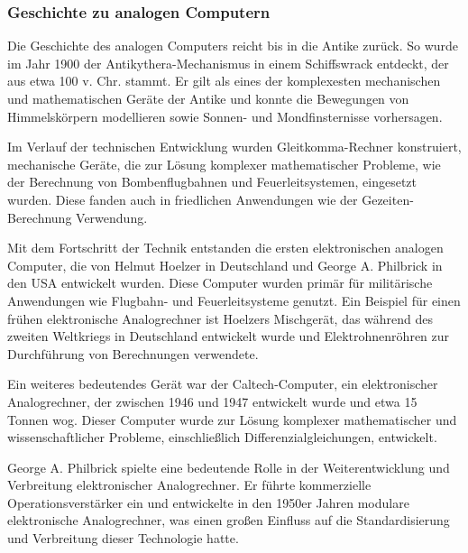 \subsubsection{Geschichte zu analogen Computern}

Die Geschichte des analogen Computers reicht bis in die Antike zurück. So wurde im Jahr 1900 der Antikythera-Mechanismus in einem Schiffswrack entdeckt, der aus etwa 100 v. Chr. stammt. Er gilt als eines der komplexesten mechanischen und mathematischen Geräte der Antike und konnte die Bewegungen von Himmelskörpern modellieren sowie Sonnen- und Mondfinsternisse vorhersagen. \cite[S. 9 f.]{Ulmann2022}

Im Verlauf der technischen Entwicklung wurden Gleitkomma-Rechner konstruiert, mechanische Geräte, die zur Lösung komplexer mathematischer Probleme, wie der Berechnung von Bombenflugbahnen und Feuerleitsystemen, eingesetzt wurden. Diese fanden auch in friedlichen Anwendungen wie der Gezeiten-Berechnung Verwendung. \cite[S. 9]{Ulmann2022}

Mit dem Fortschritt der Technik entstanden die ersten elektronischen analogen Computer, die von Helmut Hoelzer in Deutschland und George A. Philbrick in den USA entwickelt wurden. Diese Computer wurden primär für militärische Anwendungen wie Flugbahn- und Feuerleitsysteme genutzt. Ein Beispiel für einen frühen elektronische Analogrechner ist Hoelzers Mischgerät, das während des zweiten Weltkriegs in Deutschland entwickelt wurde und Elektrohnenröhren zur Durchführung von Berechnungen verwendete. \cite[S. 41 f.]{Ulmann2022}

Ein weiteres bedeutendes Gerät war der Caltech-Computer, ein elektronischer Analogrechner, der zwischen 1946 und 1947 entwickelt wurde und etwa 15 Tonnen wog. Dieser Computer wurde zur Lösung komplexer mathematischer und wissenschaftlicher Probleme, einschließlich Differenzialgleichungen, entwickelt. \cite[S. 69]{Ulmann2022}

George A. Philbrick spielte eine bedeutende Rolle in der Weiterentwicklung und Verbreitung elektronischer Analogrechner. Er führte kommerzielle Operationsverstärker ein und entwickelte in den 1950er Jahren modulare elektronische Analogrechner, was einen großen Einfluss auf die Standardisierung und Verbreitung dieser Technologie hatte. \cite[S. 136]{Ulmann2022}
